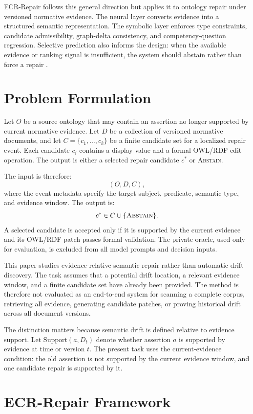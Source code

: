 \documentclass[conference]{IEEEtran}
\begin{document}
ECR-Repair follows this general direction but applies it to ontology repair under versioned normative evidence. The neural layer converts evidence into a structured semantic representation. The symbolic layer enforces type constraints, candidate admissibility, graph-delta consistency, and competency-question regression. Selective prediction also informs the design: when the available evidence or ranking signal is insufficient, the system should abstain rather than force a repair \cite{gu2023selective}.

\section{Problem Formulation}

Let $O$ be a source ontology that may contain an assertion no longer supported by current normative evidence. Let $D$ be a collection of versioned normative documents, and let $C=\{c_1,\ldots,c_k\}$ be a finite candidate set for a localized repair event. Each candidate $c_i$ contains a display value and a formal OWL/RDF edit operation. The output is either a selected repair candidate $c^\ast$ or \textsc{Abstain}.

The input is therefore:
\[
(O,D,C),
\]
where the event metadata specify the target subject, predicate, semantic type, and evidence window. The output is:
\[
c^\ast \in C \cup \{\textsc{Abstain}\}.
\]
A selected candidate is accepted only if it is supported by the current evidence and its OWL/RDF patch passes formal validation. The private oracle, used only for evaluation, is excluded from all model prompts and decision inputs.

This paper studies evidence-relative semantic repair rather than automatic drift discovery. The task assumes that a potential drift location, a relevant evidence window, and a finite candidate set have already been provided. The method is therefore not evaluated as an end-to-end system for scanning a complete corpus, retrieving all evidence, generating candidate patches, or proving historical drift across all document versions.

The distinction matters because semantic drift is defined relative to evidence support. Let $\mathrm{Support}(a,D_t)$ denote whether assertion $a$ is supported by evidence at time or version $t$. The present task uses the current-evidence condition: the old assertion is not supported by the current evidence window, and one candidate repair is supported by it.

\section{ECR-Repair Framework}
\end{document}
